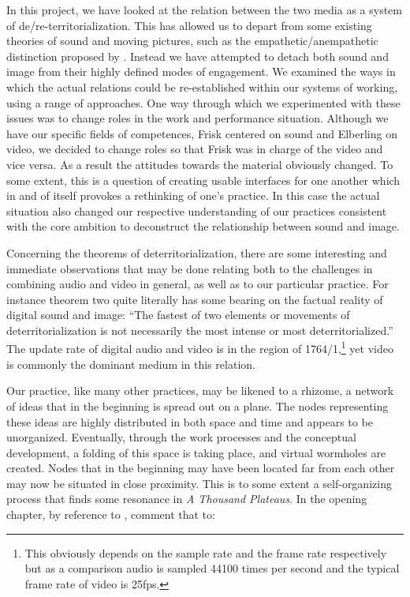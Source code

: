 \documentclass[11pt]{article}
\begin{document}
In this project, we have looked at the
relation between the two media as a system of
de/re-territorialization. This has allowed us to
depart from some existing theories of sound and moving pictures, such as the
empathetic/anempathetic distinction proposed by
\citet{Chion1994}. Instead we have
attempted to detach both sound and image from their highly defined modes
of engagement. We examined the ways in which the
actual relations could be re-established within our systems of working,
using a range of approaches. One way through which we experimented with
these issues was to change roles in the work and performance
situation. Although we have our specific fields of competences, Frisk
centered on sound and Elberling on video, we decided to 
change roles so that Frisk was in charge of the video and vice
versa. As a result the attitudes towards the
material obviously changed. To some extent, this is a question
of creating usable interfaces for one another which in and of itself
provokes a rethinking of one's practice. In this case the actual
situation also changed our respective understanding of our practices
consistent with the core ambition to
deconstruct the relationship between sound and image.

Concerning the theorems of deterritorialization, there are some
interesting and immediate observations that may be done relating both
to the challenges in combining audio and video in general, as well as to our
particular practice. For instance theorem two quite literally has
some bearing on the factual reality of digital sound and image: ``The
fastest of two elements or movements of deterritorialization is not
necessarily the most intense or most deterritorialized.''
\citep[p. 193]{deleuze80} The update rate of digital audio and video
is in the region of 1764/1,\footnote{This obviously depends on the
  sample rate and the frame rate respectively but as a
  comparison audio is sampled 44100 times per second and the typical
  frame rate of video is 25fps.} yet video is commonly the dominant medium
in this relation.

Our practice, like many other
practices, may be likened to a rhizome, a network of ideas
that in the beginning is spread out on a plane. The nodes representing these ideas are highly distributed
in both space and time and appears to be unorganized. Eventually, through the work processes and the
conceptual development, a folding of this space is taking place, and
virtual wormholes are created. Nodes that in the beginning may
have been located far from each other may now be situated in
close proximity. This is to some extent a self-organizing process that finds
some resonance in \emph{A Thousand Plateaus}. In the opening chapter, by reference to
\citet{rosenstiehl974}, \citeauthor{deleuze80} comment that to:
\end{document}
